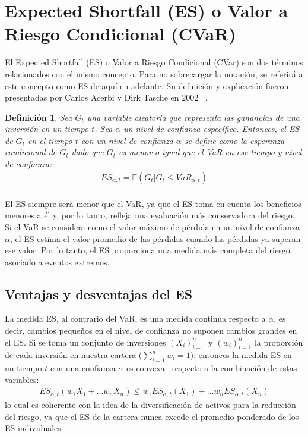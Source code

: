 \documentclass[11pt]{book}
\theoremstyle{plain} %
\newtheorem{definition}{Definición}
\theoremstyle{definition} %
\begin{document}
\section{Expected Shortfall (ES) o Valor a Riesgo Condicional (CVaR)}
El Expected Shortfall (ES) o Valor a Riesgo Condicional (CVar) son dos términos
relacionados con el mismo concepto. Para no sobrecargar la notación, se referirá a este 
concepto como ES de aquí en adelante. Su definición y explicación fueron 
presentadas por Carlos Acerbi y Dirk Tasche en 2002~\cite{AT02a} \cite{AT02b}.\\
\begin{definition}
   Sea $G_t$ una variable aleatoria que representa las ganancias de una 
   inversión en un tiempo $t$. Sea $\alpha$ un nivel de confianza específico. 
   Entonces, el ES de $G_t$ en el tiempo $t$ con un nivel 
   de confianza $\alpha$ se define como la esperanza condicional de
   $G_t$ dado que $G_t$ es menor o igual que el VaR en ese tiempo y nivel de
   confianza:
   \begin{align*}
      ES_{\alpha, t} = \mathbb{E}(G_t|G_t \leq VaR_{\alpha, t})\\
  \end{align*}
\end{definition}

El ES siempre será menor que el VaR, ya que 
el ES toma en cuenta los beneficios menores a él y, por lo tanto, refleja una 
evaluación más conservadora del riesgo. Si el VaR se considera como el 
valor máximo de pérdida en un nivel de confianza $\alpha$, el ES estima 
el valor promedio de las pérdidas cuando las pérdidas ya superan ese valor. 
Por lo tanto, el ES proporciona una medida más completa del riesgo 
asociado a eventos extremos.

\subsection{Ventajas y desventajas del ES}
La medida ES, al contrario del VaR, es una medida continua respecto a $\alpha$, 
es decir, cambios pequeños en el nivel de confianza no suponen cambios 
grandes en el ES. Si se toma un conjunto de inversiones $(X_i)_{i=1}^n$ y 
$(w_i)_{i=1}^n$ la proporción de cada inversión en nuestra cartera
($\sum_{i=1}^n w_i = 1$), entonces la medida ES en un tiempo $t$ con una 
confianza $\alpha$ es convexa~\cite{FS08} respecto a la  combinación de estas variables:
\begin{align*}
   ES_{\alpha, t}(w_1X_1+\dots w_nX_n) \leq w_1ES_{\alpha, t}(X_1)+\dots w_nES_{\alpha, t}(X_n)
\end{align*}
lo cual es coherente con la idea de la diversificación de activos para la 
reducción del riesgo, ya que el ES de la cartera nunca excede el promedio 
ponderado de los ES individuales\\
\end{document}
